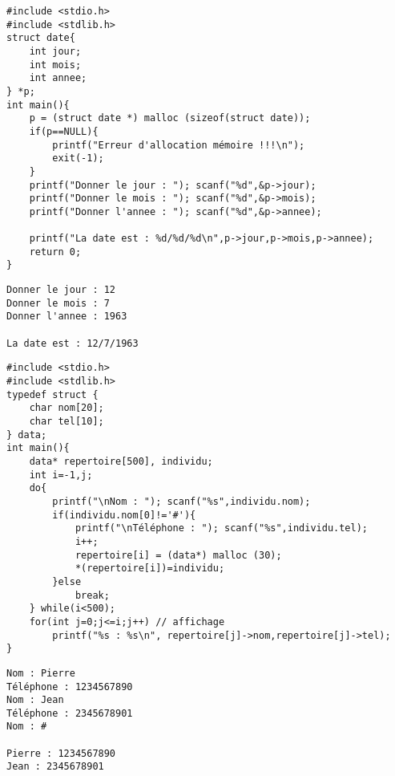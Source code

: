 \documentclass{beamer}
\begin{document}
 

\begin{frame}[fragile]
\begin{verbatim}
#include <stdio.h>
#include <stdlib.h>
struct date{
    int jour;
    int mois;
    int annee;
} *p;
int main(){
    p = (struct date *) malloc (sizeof(struct date));
    if(p==NULL){
        printf("Erreur d'allocation mémoire !!!\n");
        exit(-1);
    }
    printf("Donner le jour : "); scanf("%d",&p->jour);
    printf("Donner le mois : "); scanf("%d",&p->mois);
    printf("Donner l'annee : "); scanf("%d",&p->annee);
    
    printf("La date est : %d/%d/%d\n",p->jour,p->mois,p->annee);
    return 0;
}
\end{verbatim}
\end{frame}

\begin{frame}[fragile]
\begin{verbatim}
Donner le jour : 12
Donner le mois : 7
Donner l'annee : 1963

La date est : 12/7/1963

\end{verbatim}
\end{frame}


\begin{frame}[fragile]
\begin{verbatim}
#include <stdio.h>
#include <stdlib.h>
typedef struct {
    char nom[20];
    char tel[10];
} data;
int main(){
    data* repertoire[500], individu;
    int i=-1,j;
    do{
        printf("\nNom : "); scanf("%s",individu.nom);
        if(individu.nom[0]!='#'){
            printf("\nTéléphone : "); scanf("%s",individu.tel);
            i++;
            repertoire[i] = (data*) malloc (30);
            *(repertoire[i])=individu;
        }else
            break;
    } while(i<500);
    for(int j=0;j<=i;j++) // affichage
        printf("%s : %s\n", repertoire[j]->nom,repertoire[j]->tel);
}
\end{verbatim}
{\tiny
\begin{verbatim}
Nom : Pierre
Téléphone : 1234567890
Nom : Jean
Téléphone : 2345678901
Nom : #

Pierre : 1234567890
Jean : 2345678901
\end{verbatim}
}
\end{frame}

\end{document}
